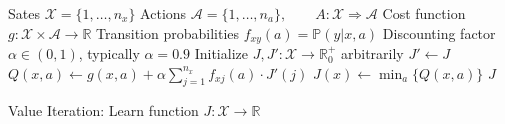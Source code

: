 \documentclass{article}
\begin{document}
\begin{preview}
    \begin{algorithm}[H]
        \begin{algorithmic}
        \Require
        \Statex Sates $\mathcal{X} = \{1, \dots, n_x\}$
        \Statex Actions $\mathcal{A} = \{1, \dots, n_a\},\qquad A: \mathcal{X} \Rightarrow \mathcal{A}$
        \Statex Cost function $g: \mathcal{X} \times \mathcal{A} \rightarrow \mathbb{R}$
        \Statex Transition probabilities $f_{xy}(a) = \mathbb{P}(y | x, a)$
        \Statex Discounting factor $\alpha \in (0, 1)$, typically $\alpha = 0.9$
            \State Initialize $J, J': \mathcal{X} \rightarrow \mathbb{R}_0^+$ arbitrarily
                \State $J' \gets J$
                        \State $Q(x, a) \gets g(x, a) + \alpha \sum_{j=1}^{n_x} f_{xj}(a) \cdot J'(j)$
                    \EndFor
                \EndFor
                    \State $J(x) \gets \min_a \{Q(x, a)\}$
                \EndFor
            \EndWhile
            \Return $J$
        \EndProcedure
        \end{algorithmic}
    \caption{Value Iteration: Learn function $J: \mathcal{X} \rightarrow \mathbb{R}$}
    \label{alg:value-iteration}
    \end{algorithm}
\end{preview}
\end{document}
